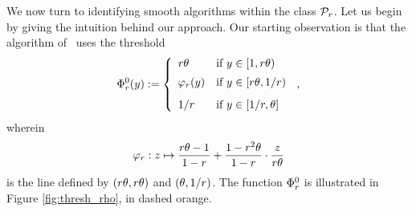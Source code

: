 We now turn to identifying smooth algorithms within the class $\mathcal{P}_r$. Let us begin by giving the intuition behind our approach. Our starting observation is that the algorithm of~\citet{sun_pareto-optimal_2021} uses the threshold
\[
\Phi^0_r(y) := \left\{
 \begin{array}{lll}
    r \theta & \text{if } y \in [1,r \theta) \\[5pt]
     \varphi_r(y) &\text{if } y \in [r \theta, 1/r)\\[8pt]
     1/r & \text{if } y \in [1/r, \theta]
\end{array}
\right.\,,
\]
wherein 
\[
\varphi_r : z \mapsto \frac{r \theta - 1}{1 - r} + \frac{1 - r^2 \theta}{1 - r} \cdot \frac{z}{r \theta}
\]
is the line defined by $(r\theta, r \theta)$ and $(\theta, 1/r)$. The function $\Phi^0_r$ is illustrated in Figure \ref{fig:thresh_rho}, in dashed orange.


